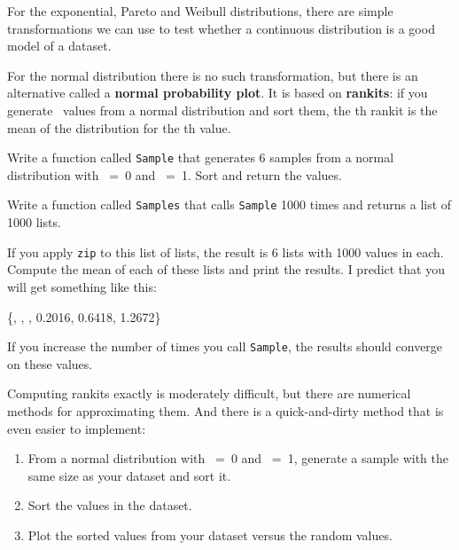 \documentclass[12pt]{book}
\begin{document}
For the exponential, Pareto and Weibull distributions, there are
simple transformations we can use to test whether a continuous
distribution is a good model of a dataset.

For the normal distribution there is no such transformation, but there
is an alternative called a {\bf normal probability plot}.  It is based
on {\bf rankits}: if you generate \n~values from a normal
distribution and sort them, the \kk th rankit is the mean of the
distribution for the \kk th value.

\begin{exercise}
Write a function called {\tt Sample} that generates 6 samples from a
normal distribution with \mymu~=~0 and \mysigma~=~1.  Sort and return
the values.

Write a function called {\tt Samples} that calls {\tt Sample} 1000 times and
returns a list of 1000 lists.

If you apply {\tt zip} to this list of lists, the result is 6 lists
with 1000 values in each.  Compute the mean of each of these lists
and print the results.  I predict that you will get something like
this:

\{,   ,   ,   0.2016,   0.6418,   1.2672\}

If you increase the number of times you call {\tt Sample}, the
results should converge on these values.

\end{exercise}


Computing rankits exactly is moderately difficult, but there are
numerical methods for approximating them.  And there is a
quick-and-dirty method that is even easier to implement:

\begin{enumerate}

\item From a normal distribution with \mymu~=~0 and \mysigma~=~1,
generate a sample with the same size as your dataset and sort it.

\item Sort the values in the dataset.

\item Plot the sorted values from your dataset versus the random values.

\end{enumerate}
\end{document}
